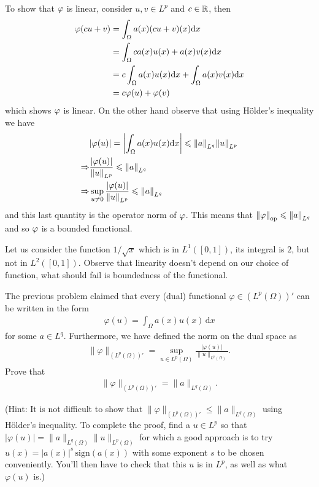 \documentclass[12pt]{memoir}
\begin{document}
\begin{ptcbr}
  To show that $\varphi$ is linear, consider $u,v\in L^p$ and $c\in\mathbb{R}$, then 
  \begin{align*}
  \varphi(cu+v)&=\int_\Omega a(x)(cu+v)(x)\dd x\\
  &=\int_\Omega ca(x)u(x)+a(x)v(x)\dd x\\
  &=c\int_\Omega a(x)u(x)\dd x+\int_\Omega a(x)v(x)\dd x\\
  &=c\varphi(u)+\varphi(v)
  \end{align*}
  which shows $\varphi$ is linear. On the other hand observe that using H\"older's inequality we have 
\begin{align*}
  &|\varphi(u)|=\left|\int_\Omega a(x)u(x)\dd x\right|\leqslant\norm{a}_{L^q}\norm{u}_{L^p}\\
  \Rightarrow& \frac{|\varphi(u)|}{\norm{u}_{L^p}}\leqslant\norm{a}_{L^q}\\
  \Rightarrow&\sup_{u\neq 0}\frac{|\varphi(u)|}{\norm{u}_{L^p}}\leqslant\norm{a}_{L^q}
\end{align*}
  and this last quantity is the operator norm of $\varphi$. This means that $\norm{\varphi}_{\text{op}}\leqslant\norm{a}_{L^q}$ and so $\varphi$ is a bounded functional.\par
  Let us consider the function $1/\sqrt{x}$ which is in $L^1([0,1])$, its integral is $2$, but not in $L^2([0,1])$. Observe that linearity doesn't depend on our choice of function, what should fail is boundedness of the functional.
\end{ptcbr}
\begin{Ej}
    The previous problem claimed that every (dual) functional $\varphi\in (L^p(\Omega))'$
can be written in the form
\begin{align*}
  \varphi(u) = \int_\Omega a(x) u(x) \, \text{d}x
\end{align*}
for some $a\in L^q$. Furthermore, we have defined the norm on the dual
space as
\begin{align*}
  \|\varphi\|_{(L^p(\Omega))'} =
  \sup_{u\in L^p(\Omega)} \frac{|\varphi(u)|}{\|u\|_{L^p(\Omega)}}.
\end{align*}
Prove that
\begin{align*}
  \|\varphi\|_{(L^p(\Omega))'} = \|a\|_{L^q(\Omega)}.
\end{align*}

(Hint: It is not difficult to show that $\|\varphi\|_{(L^p(\Omega))'}
\le \|a\|_{L^q(\Omega)}$ using H\"older's inequality. To complete the proof, find a $u\in L^p$ so
  that $|\varphi(u)|=\|a\|_{L^q(\Omega)}\|u\|_{L^p(\Omega)}$ for which
  a good approach is to try $u(x)=|a(x)|^s \,\text{sign}(a(x))$ with some exponent $s$ to
  be chosen conveniently. You'll then have to check that this $u$ is
  in $L^p$, as well as what $\varphi(u)$ is.)
\end{Ej}
\end{document}
